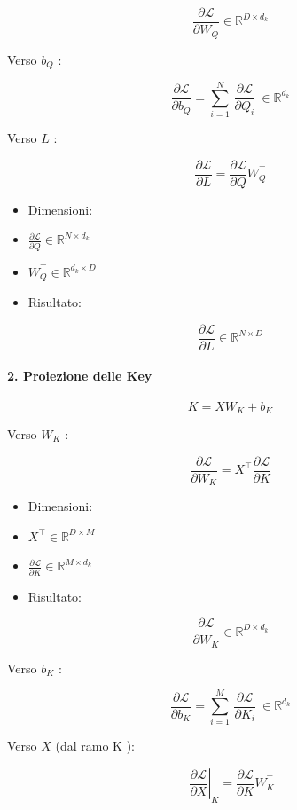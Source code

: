 \documentclass[
  11pt,
]{article}
\begin{document}
\[\frac{\partial\mathcal{L}}{\partial W_{Q}} \in \mathbb{R}^{D \times d_{k}}\]

Verso \(b_{Q}\) :

\[\frac{\partial\mathcal{L}}{\partial b_{Q}} = \sum_{i = 1}^{N}\,\frac{\partial\mathcal{L}}{\partial Q_{i}}\  \in \mathbb{R}^{d_{k}}\]

Verso \(L\) :

\[\frac{\partial\mathcal{L}}{\partial L} = \frac{\partial\mathcal{L}}{\partial Q}W_{Q}^{\top}\]

\begin{itemize}
\item
  Dimensioni:
\item
  \(\frac{\partial\mathcal{L}}{\partial Q} \in \mathbb{R}^{N \times d_{k}}\)
\item
  \(W_{Q}^{\top} \in \mathbb{R}^{d_{k} \times D}\)
\item
  Risultato:
\end{itemize}

\[\frac{\partial\mathcal{L}}{\partial L} \in \mathbb{R}^{N \times D}\]

\paragraph{2. Proiezione delle Key}

\[K = XW_{K} + b_{K}\]

Verso \(W_{K}\) :

\[\frac{\partial\mathcal{L}}{\partial W_{K}} = X^{\top}\frac{\partial\mathcal{L}}{\partial K}\]

\begin{itemize}
\item
  Dimensioni:
\item
  \(X^{\top} \in \mathbb{R}^{D \times M}\)
\item
  \(\frac{\partial\mathcal{L}}{\partial K} \in \mathbb{R}^{M \times d_{k}}\)
\item
  Risultato:
\end{itemize}

\[\frac{\partial\mathcal{L}}{\partial W_{K}} \in \mathbb{R}^{D \times d_{k}}\]

Verso \(b_{K}\) :

\[\frac{\partial\mathcal{L}}{\partial b_{K}} = \sum_{i = 1}^{M}\,\frac{\partial\mathcal{L}}{\partial K_{i}}\  \in \mathbb{R}^{d_{k}}\]

Verso \(X\) (dal ramo K ):

\[\left. \ \frac{\partial\mathcal{L}}{\partial X} \right|_{K} = \frac{\partial\mathcal{L}}{\partial K}W_{K}^{\top}\]
\end{document}
